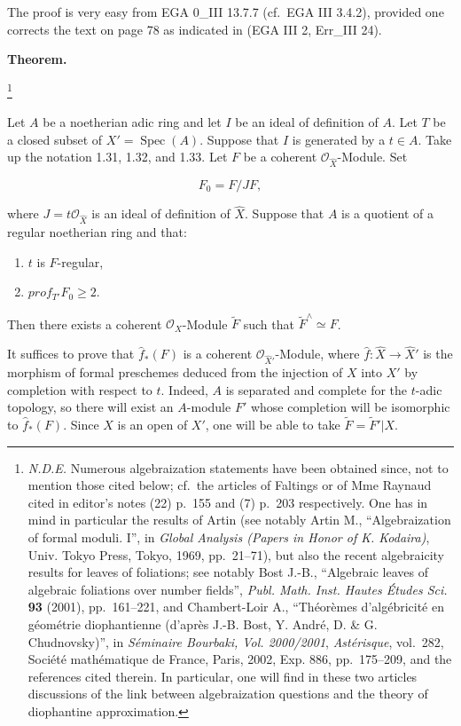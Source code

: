 \documentclass[
]{article}
\begin{document}
The proof is very easy from EGA 0\_III 13.7.7 (cf.~EGA III 3.4.2),
provided one corrects the text on page 78 as indicated in (EGA III 2,
Err\_III 24).

\textbf{Theorem.}

\footnote{\emph{N.D.E.} Numerous algebraization statements have been
  obtained since, not to mention those cited below; cf.~the articles of
  Faltings or of Mme Raynaud cited in editor's notes (22) p.~155 and (7)
  p.~203 respectively. One has in mind in particular the results of
  Artin (see notably Artin M., ``Algebraization of formal moduli. I'',
  in \emph{Global Analysis (Papers in Honor of K. Kodaira)}, Univ. Tokyo
  Press, Tokyo, 1969, pp.~21--71), but also the recent algebraicity
  results for leaves of foliations; see notably Bost J.-B., ``Algebraic
  leaves of algebraic foliations over number fields'', \emph{Publ. Math.
  Inst. Hautes Études Sci.} \textbf{93} (2001), pp.~161--221, and
  Chambert-Loir A., ``Théorèmes d'algébricité en géométrie diophantienne
  (d'après J.-B. Bost, Y. André, D. \& G. Chudnovsky)'', in
  \emph{Séminaire Bourbaki, Vol. 2000/2001}, \emph{Astérisque},
  vol.~282, Société mathématique de France, Paris, 2002, Exp. 886,
  pp.~175--209, and the references cited therein. In particular, one
  will find in these two articles discussions of the link between
  algebraization questions and the theory of diophantine approximation.}

Let \(A\) be a noetherian adic ring and let \(I\) be an ideal of
definition of \(A\). Let \(T\) be a closed subset of
\(X' = \operatorname{Spec}(A)\). Suppose that \(I\) is generated by a
\(t \in A\). Take up the notation 1.31, 1.32, and 1.33. Let \(F\) be a
coherent \(\mathcal{O}_{\hat{X}}\)-Module. Set

\[
F_{0} = F/J F,
\]

where \(J = t\mathcal{O}_{\hat{X}}\) is an ideal of definition of
\(\hat{X}\). Suppose that \(A\) is a quotient of a regular noetherian
ring and that:

\begin{enumerate}
\def\labelenumi{(\arabic{enumi})}
\item
  \(t\) is \(F\)-regular,
\item
  \(prof_{T'} F_{0} \geqslant 2\).
\end{enumerate}

Then there exists a coherent \(\mathcal{O}_{X}\)-Module \(\tilde{F}\)
such that \(\tilde{F}^{\wedge} \simeq F\).

It suffices to prove that \(\hat{f}_{*}(F)\) is a coherent
\(\mathcal{O}_{\hat{X}'}\)-Module, where
\(\hat{f}: \hat{X} \to \hat{X}'\) is the morphism of formal preschemes
deduced from the injection of \(X\) into \(X'\) by completion with
respect to \(t\). Indeed, \(A\) is separated and complete for the
\(t\)-adic topology, so there will exist an \(A\)-module \(F'\) whose
completion will be isomorphic to \(\hat{f}_{*}(F)\). Since \(X\) is an
open of \(X'\), one will be able to take \(\tilde{F} = \tilde{F}' | X\).
\end{document}
